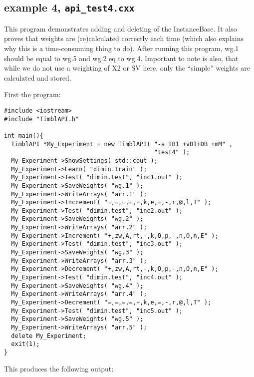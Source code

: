 \documentclass{report}
\begin{document}
\subsection{example 4, {\tt api\_test4.cxx}}

This program demonstrates adding and deleting of the InstanceBase.  It
also proves that weights are (re)calculated correctly each time (which
also explains why this is a time-consuming thing to do). After running
this program, wg.1 should be equal to wg.5 and wg.2 eq to
wg.4. Important to note is also, that while we do not use a weighting
of X2 or SV here, only the ``simple'' weights are calculated and
stored.

First the program: 

\begin{footnotesize}
\begin{verbatim}
#include <iostream>
#include "TimblAPI.h"

int main(){
  TimblAPI *My_Experiment = new TimblAPI( "-a IB1 +vDI+DB +mM" , 
                                          "test4" );
  My_Experiment->ShowSettings( std::cout );
  My_Experiment->Learn( "dimin.train" );  
  My_Experiment->Test( "dimin.test", "inc1.out" );
  My_Experiment->SaveWeights( "wg.1" );  
  My_Experiment->WriteArrays( "arr.1" );  
  My_Experiment->Increment( "=,=,=,=,+,k,e,=,-,r,@,l,T" );  
  My_Experiment->Test( "dimin.test", "inc2.out" );
  My_Experiment->SaveWeights( "wg.2" );  
  My_Experiment->WriteArrays( "arr.2" );  
  My_Experiment->Increment( "+,zw,A,rt,-,k,O,p,-,n,O,n,E" );  
  My_Experiment->Test( "dimin.test", "inc3.out" );
  My_Experiment->SaveWeights( "wg.3" );  
  My_Experiment->WriteArrays( "arr.3" );  
  My_Experiment->Decrement( "+,zw,A,rt,-,k,O,p,-,n,O,n,E" );  
  My_Experiment->Test( "dimin.test", "inc4.out" );
  My_Experiment->SaveWeights( "wg.4" );  
  My_Experiment->WriteArrays( "arr.4" );  
  My_Experiment->Decrement( "=,=,=,=,+,k,e,=,-,r,@,l,T" );  
  My_Experiment->Test( "dimin.test", "inc5.out" );
  My_Experiment->SaveWeights( "wg.5" );  
  My_Experiment->WriteArrays( "arr.5" );  
  delete My_Experiment;
  exit(1);
}
\end{verbatim}
\end{footnotesize}


This produces the following output:
\end{document}
